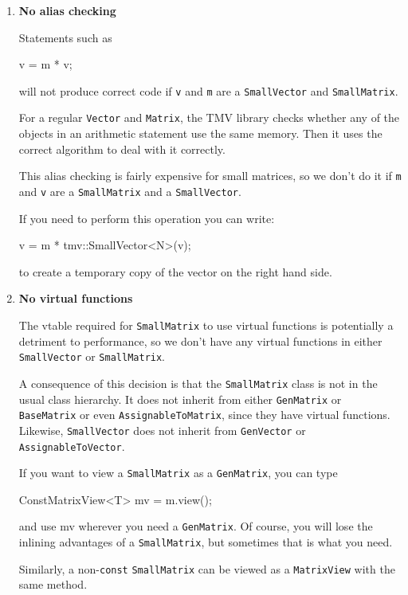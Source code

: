 \documentclass[twoside,letterpaper,11pt]{article}
\renewcommand{\tt}[1]{{\lstinline {#1}}}
\begin{document}
\begin{enumerate}

\item
\textbf{No alias checking}

Statements such as 
\begin{tmvcode}
v = m * v;
\end{tmvcode}
will not produce correct code if \tt{v} and \tt{m} are a \tt{SmallVector} and \tt{SmallMatrix}.  

For a regular \tt{Vector} and \tt{Matrix}, the TMV library checks whether any of 
the objects in an arithmetic statement use the same memory.  
Then it uses the correct algorithm to deal with it 
correctly.  

This alias checking is fairly expensive for small matrices, so we don't do it if
\tt{m} and \tt{v} are a \tt{SmallMatrix} and a \tt{SmallVector}.  

If you need to perform this operation you can write:
\begin{tmvcode}
v = m * tmv::SmallVector<N>(v);
\end{tmvcode}
to create a temporary copy of the vector on the right hand side. 

\item
\textbf{No virtual functions}

The vtable required for \tt{SmallMatrix} to use virtual functions is potentially a 
detriment to performance, so we don't have any virtual functions in either \tt{SmallVector}
or \tt{SmallMatrix}. 

A consequence of this decision is that the \tt{SmallMatrix} class is not in the usual
class hierarchy.  It
does not inherit from either \tt{GenMatrix} or \tt{BaseMatrix} or even \tt{AssignableToMatrix}, 
since they have virtual functions.  
Likewise, \tt{SmallVector} does not inherit from \tt{GenVector} or \tt{AssignableToVector}.

If you want to view a \tt{SmallMatrix} as a \tt{GenMatrix}, you can type
\begin{tmvcode}
ConstMatrixView<T> mv = m.view();
\end{tmvcode}
and use mv wherever you need a \tt{GenMatrix}.  Of course, you will lose the 
inlining advantages of a \tt{SmallMatrix}, but sometimes that is what you need.

Similarly, a non-\tt{const} \tt{SmallMatrix} can be viewed as a \tt{MatrixView}
with the same method.


\end{enumerate}
\end{document}
